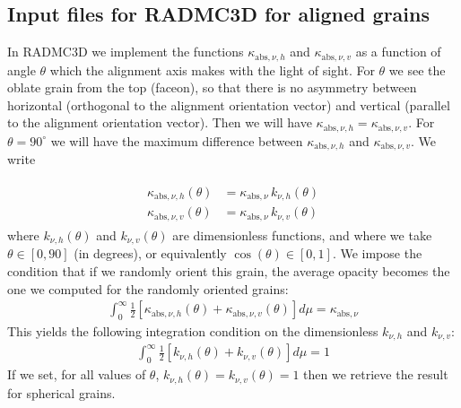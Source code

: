 \documentclass[letterpaper,10pt,english]{sphinxmanual}
\begin{document}
\subsection{Input files for RADMC\sphinxhyphen{}3D for aligned grains}
\label{\detokenize{dustradtrans:input-files-for-radmc-3d-for-aligned-grains}}
In RADMC\sphinxhyphen{}3D we implement the functions \(\kappa_{\mathrm{abs},\nu,h}\) and
\(\kappa_{\mathrm{abs},\nu,v}\) as a function of angle \(\theta\) which the
alignment axis makes with the light of sight. For \(\theta\) we see the oblate
grain from the top (face\sphinxhyphen{}on), so that there is no asymmetry between
horizontal (orthogonal to the alignment orientation vector) and vertical
(parallel to the alignment orientation vector). Then we will have
\(\kappa_{\mathrm{abs},\nu,h}=\kappa_{\mathrm{abs},\nu,v}\). For
\(\theta=90^{\circ}\) we will have the maximum difference between
\(\kappa_{\mathrm{abs},\nu,h}\) and \(\kappa_{\mathrm{abs},\nu,v}\). We write

\label{\detokenize{dustradtrans:eq-align-kappa-k-hv}}\begin{equation*}
\begin{split}\begin{split}
\kappa_{\mathrm{abs},\nu,h}(\theta) &= \kappa_{\mathrm{abs},\nu}\,k_{\nu,h}(\theta)\\
\kappa_{\mathrm{abs},\nu,v}(\theta) &= \kappa_{\mathrm{abs},\nu}\,k_{\nu,v}(\theta)
\end{split}\end{split}
\end{equation*}
where \(k_{\nu,h}(\theta)\) and \(k_{\nu,v}(\theta)\) are dimensionless
functions, and where we take \(\theta\in[0,90]\) (in degrees), or
equivalently \(\cos(\theta)\in [0,1]\). We impose the condition that if we
randomly orient this grain, the average opacity becomes the one we computed for
the randomly oriented grains:
\begin{equation*}
\begin{split}\int_0^\infty \frac{1}{2}\left[\kappa_{\mathrm{abs},\nu,h}(\theta)
+\kappa_{\mathrm{abs},\nu,v}(\theta)\right]d\mu = \kappa_{\mathrm{abs},\nu}\end{split}
\end{equation*}
This yields the following integration condition on the dimensionless
\(k_{\nu,h}\) and \(k_{\nu,v}\):
\begin{equation*}
\begin{split}\int_0^\infty \frac{1}{2}\left[k_{\nu,h}(\theta)+k_{\nu,v}(\theta)\right]d\mu = 1\end{split}
\end{equation*}
If we set, for all values of \(\theta\),
\(k_{\nu,h}(\theta)=k_{\nu,v}(\theta)=1\) then we retrieve the result for
spherical grains.
\end{document}
